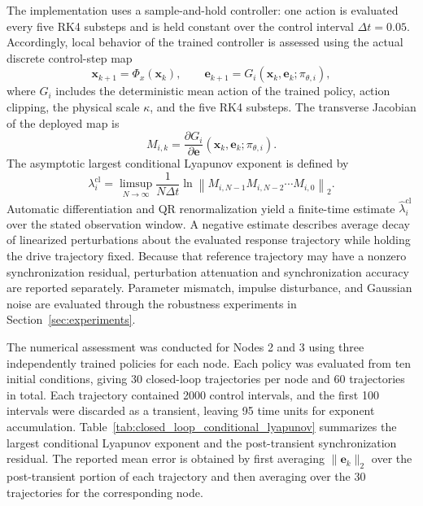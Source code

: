 \documentclass[a4paper,fleqn]{cas-dc}
\theoremstyle{plain}
\theoremstyle{definition}
\begin{document}
The implementation uses a sample-and-hold controller: one action is evaluated every five RK4 substeps and is held constant over the control interval $\Delta t=0.05$. Accordingly, local behavior of the trained controller is assessed using the actual discrete control-step map
\begin{equation}
	\mathbf{x}_{k+1}=\Phi_x(\mathbf{x}_k),
	\qquad
	\mathbf{e}_{k+1}=G_i(\mathbf{x}_k,\mathbf{e}_k;\pi_{\theta,i}),
	\label{eq:sampled_closed_loop_map}
\end{equation}
where $G_i$ includes the deterministic mean action of the trained policy, action clipping, the physical scale $\kappa$, and the five RK4 substeps. The transverse Jacobian of the deployed map is
\begin{equation}
	M_{i,k}
	=
	\frac{\partial G_i}{\partial\mathbf{e}}
	(\mathbf{x}_k,\mathbf{e}_k;\pi_{\theta,i}).
	\label{eq:sampled_error_jacobian}
\end{equation}
The asymptotic largest conditional Lyapunov exponent is defined by
\begin{equation}
	\lambda_i^{\mathrm{cl}}
	=
	\limsup_{N\to\infty}
	\frac{1}{N\Delta t}
	\ln
	\left\|
	M_{i,N-1}M_{i,N-2}\cdots M_{i,0}
	\right\|_2.
	\label{eq:closed_loop_conditional_lyapunov}
\end{equation}
Automatic differentiation and QR renormalization yield a finite-time estimate $\widehat\lambda_i^{\mathrm{cl}}$ over the stated observation window. A negative estimate describes average decay of linearized perturbations about the evaluated response trajectory while holding the drive trajectory fixed. Because that reference trajectory may have a nonzero synchronization residual, perturbation attenuation and synchronization accuracy are reported separately. Parameter mismatch, impulse disturbance, and Gaussian noise are evaluated through the robustness experiments in Section~\ref{sec:experiments}.

The numerical assessment was conducted for Nodes 2 and 3 using three independently trained policies for each node. Each policy was evaluated from ten initial conditions, giving 30 closed-loop trajectories per node and 60 trajectories in total. Each trajectory contained 2000 control intervals, and the first 100 intervals were discarded as a transient, leaving 95 time units for exponent accumulation. Table~\ref{tab:closed_loop_conditional_lyapunov} summarizes the largest conditional Lyapunov exponent and the post-transient synchronization residual. The reported mean error is obtained by first averaging $\|\mathbf{e}_k\|_2$ over the post-transient portion of each trajectory and then averaging over the 30 trajectories for the corresponding node.
\end{document}
